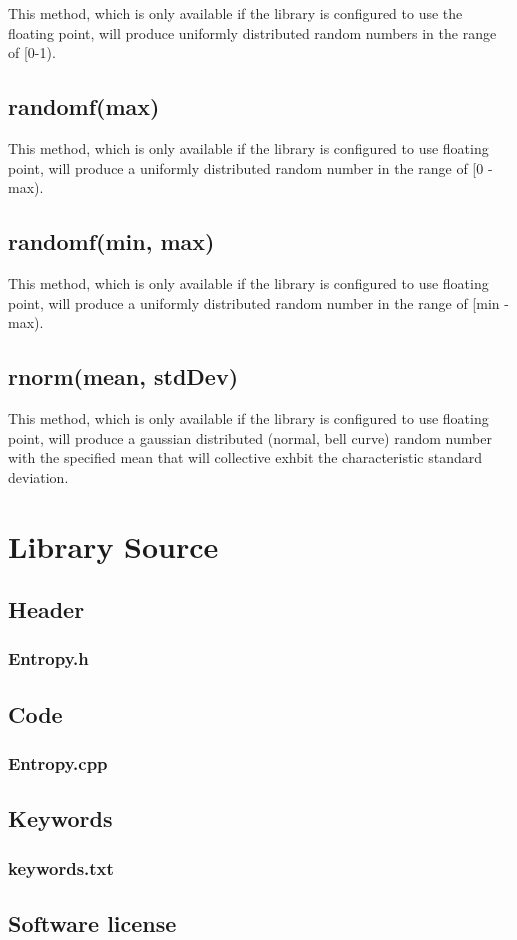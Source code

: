 \documentclass[10pt]{report}
\newcommand{\code}[2]{
 \hrulefill
 \subsection*{#1}
 
 \vspace{2em}
}
\begin{document}
This method, which is only available if the library is configured to use the floating point, will produce 
uniformly distributed random numbers in the range of [0-1).

\section{randomf(max)}

This method, which is only available if the library is configured to use floating point, will produce a uniformly 
distributed random number in the range of [0 - max).

\section{randomf(min, max)}

This method, which is only available if the library is configured to use floating point, will produce a uniformly 
distributed random number in the range of [min - max).

\section{rnorm(mean, stdDev)}

This method, which is only available if the library is configured to use floating point, will produce a gaussian 
distributed (normal, bell curve) random number with the specified mean that will collective exhbit the characteristic
standard deviation.

\chapter{Library Source}

\section{Header}

\code{Entropy.h}{../Entropy.h}

\section{Code}

\code{Entropy.cpp}{../Entropy.cpp}

\section{Keywords}

\code{keywords.txt}{../keywords.txt}

\section{Software license}

\code{}{../gpl.txt}




\end{document}
